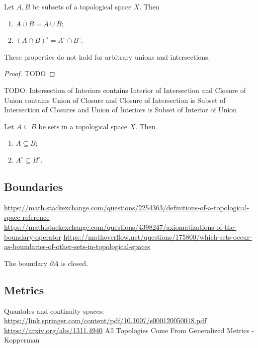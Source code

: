 \begin{lemma}
Let $A,B$ be subsets of a topological space $X$. Then
\begin{enumerate}
\item $\overline{A\cup B} = \overline{A}\cup \overline{B}$;
\item $(A\cap B)^\circ = A^\circ \cap B^\circ$.
\end{enumerate}
These properties do not hold for arbitrary unions and intersections.
\end{lemma}
\begin{proof}
TODO
\end{proof}
\begin{lemma}
TODO: Intersection of Interiors contains Interior of Intersection and Closure of Union contains Union of Closure and Closure of Intersection is Subset of Intersection of Closures and Union of Interiors is Subset of Interior of Union
\end{lemma}

\begin{lemma} \label{closureInteriorSubsets}
Let $A\subseteq B$ be sets in a topological space $X$. Then
\begin{enumerate}
\item $\overline{A} \subseteq \overline{B}$;
\item $A^\circ \subseteq B^\circ$.
\end{enumerate}
\end{lemma}

\subsection{Boundaries}
\url{https://math.stackexchange.com/questions/2254363/definitions-of-a-topological-space-reference}
\url{https://math.stackexchange.com/questions/4398247/axiomatizations-of-the-boundary-operator}
\url{https://mathoverflow.net/questions/175800/which-sets-occur-as-boundaries-of-other-sets-in-topological-spaces}

\begin{lemma}
The boundary $\partial A$ is closed.
\end{lemma}

\subsection{Metrics}
Quantales and continuity spaces: \url{https://link.springer.com/content/pdf/10.1007/s000120050018.pdf}
\url{https://arxiv.org/abs/1311.4940}
All Topologies Come From Generalized Metrics - Kopperman

